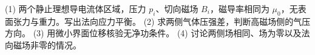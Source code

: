 (1) 两个静止理想导电流体区域，压力 \(p_i\)、切向磁场 \(B_i\)，磁导率相同为 \(\mu_0\)，无表面张力与重力。写出法向应力平衡。
(2) 求两侧气体压强差，判断高磁场侧的气压方向。
(3) 用微小界面位移核验无净功条件。
(4) 讨论两侧场相同、场为零以及法向磁场非零的情况。
